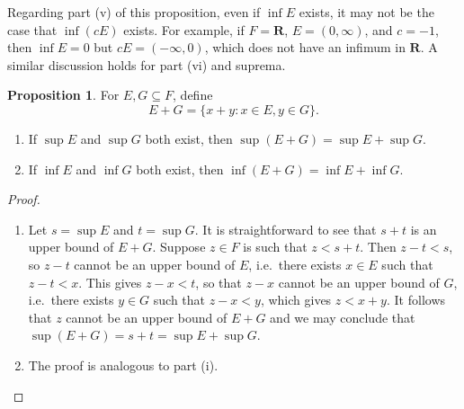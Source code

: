 \documentclass[12pt]{article}
\theoremstyle{definition}
\newtheorem{proposition}[definition]{Proposition}
\newcommand{\R}{\mathbf{R}}
\begin{document}
Regarding part (v) of this proposition, even if \( \inf E \) exists, it may not be the case that \( \inf (cE) \) exists. For example, if \( F = \R \), \( E = (0, \infty) \), and \( c = -1 \), then \( \inf E = 0 \) but \( cE = (-\infty, 0) \), which does not have an infimum in \( \R \). A similar discussion holds for part (vi) and suprema.

\begin{proposition}
\label{prop:add_sets}
    For \( E, G \subseteq F \), define
    \[
        E + G = \{ x + y : x \in E, y \in G \}. 
    \]
    \begin{enumerate}[label = (\roman*)]
        \item If \( \sup E \) and \( \sup G \) both exist, then \( \sup(E + G) = \sup E + \sup G \).

        \item If \( \inf E \) and \( \inf G \) both exist, then \( \inf(E + G) = \inf E + \inf G \).
    \end{enumerate}
\end{proposition}

\begin{proof}
    \begin{enumerate}[label = (\roman*)]
        \item Let \( s = \sup E \) and \( t = \sup G \). It is straightforward to see that \( s + t \) is an upper bound of \( E + G \). Suppose \( z \in F \) is such that \( z < s + t \). Then \( z - t < s \), so \( z - t \) cannot be an upper bound of \( E \), i.e.\ there exists \( x \in E \) such that \( z - t < x \). This gives \( z - x < t \), so that \( z - x \) cannot be an upper bound of \( G \), i.e.\ there exists \( y \in G \) such that \( z - x < y \), which gives \( z < x + y \). It follows that \( z \) cannot be an upper bound of \( E + G \) and we may conclude that \( \sup(E + G) = s + t = \sup E + \sup G \).

        \item The proof is analogous to part (i). \qedhere
    \end{enumerate}
\end{proof}
\end{document}
